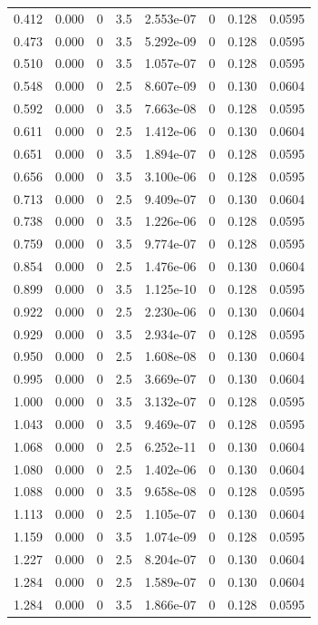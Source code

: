 \documentclass[preview]{standalone}
\begin{document}
{{\begin{tabular}{L{1.2cm}C{1.2cm} C{0.3cm}C{0.5cm} C{1.4cm}C{1.4cm} C{1.4cm}C{1.4cm}}
  0.412  &  0.000  & 0     & 3.5 &  2.553e-07  & 0  & 0.128 &  0.0595   \\ 
  0.473  &  0.000  & 0     & 3.5 &  5.292e-09  & 0  & 0.128 &  0.0595   \\ 
  0.510  &  0.000  & 0     & 3.5 &  1.057e-07  & 0  & 0.128 &  0.0595   \\ 
  0.548  &  0.000  & 0     & 2.5 &  8.607e-09  & 0  & 0.130 &  0.0604   \\ 
  0.592  &  0.000  & 0     & 3.5 &  7.663e-08  & 0  & 0.128 &  0.0595   \\ 
  0.611  &  0.000  & 0     & 2.5 &  1.412e-06  & 0  & 0.130 &  0.0604   \\ 
  0.651  &  0.000  & 0     & 3.5 &  1.894e-07  & 0  & 0.128 &  0.0595   \\ 
  0.656  &  0.000  & 0     & 3.5 &  3.100e-06  & 0  & 0.128 &  0.0595   \\ 
  0.713  &  0.000  & 0     & 2.5 &  9.409e-07  & 0  & 0.130 &  0.0604   \\ 
  0.738  &  0.000  & 0     & 3.5 &  1.226e-06  & 0  & 0.128 &  0.0595   \\ 
  0.759  &  0.000  & 0     & 3.5 &  9.774e-07  & 0  & 0.128 &  0.0595   \\ 
  0.854  &  0.000  & 0     & 2.5 &  1.476e-06  & 0  & 0.130 &  0.0604   \\ 
  0.899  &  0.000  & 0     & 3.5 &  1.125e-10  & 0  & 0.128 &  0.0595   \\ 
  0.922  &  0.000  & 0     & 2.5 &  2.230e-06  & 0  & 0.130 &  0.0604   \\ 
  0.929  &  0.000  & 0     & 3.5 &  2.934e-07  & 0  & 0.128 &  0.0595   \\ 
  0.950  &  0.000  & 0     & 2.5 &  1.608e-08  & 0  & 0.130 &  0.0604   \\ 
  0.995  &  0.000  & 0     & 2.5 &  3.669e-07  & 0  & 0.130 &  0.0604   \\ 
  1.000  &  0.000  & 0     & 3.5 &  3.132e-07  & 0  & 0.128 &  0.0595   \\ 
  1.043  &  0.000  & 0     & 3.5 &  9.469e-07  & 0  & 0.128 &  0.0595   \\ 
  1.068  &  0.000  & 0     & 2.5 &  6.252e-11  & 0  & 0.130 &  0.0604   \\ 
  1.080  &  0.000  & 0     & 2.5 &  1.402e-06  & 0  & 0.130 &  0.0604   \\ 
  1.088  &  0.000  & 0     & 3.5 &  9.658e-08  & 0  & 0.128 &  0.0595   \\ 
  1.113  &  0.000  & 0     & 2.5 &  1.105e-07  & 0  & 0.130 &  0.0604   \\ 
  1.159  &  0.000  & 0     & 3.5 &  1.074e-09  & 0  & 0.128 &  0.0595   \\ 
  1.227  &  0.000  & 0     & 2.5 &  8.204e-07  & 0  & 0.130 &  0.0604   \\ 
  1.284  &  0.000  & 0     & 2.5 &  1.589e-07  & 0  & 0.130 &  0.0604   \\ 
  1.284  &  0.000  & 0     & 3.5 &  1.866e-07  & 0  & 0.128 &  0.0595   \\ 
\hline 
\end{tabular} 

}}
\end{document}
